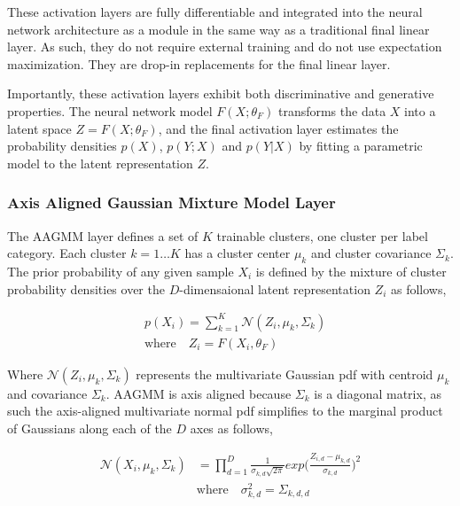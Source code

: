 \documentclass[10pt,twocolumn,letterpaper]{article}
\begin{document}
These activation layers are fully differentiable and integrated into the neural network architecture as a module in the same way as a traditional final linear layer. 
As such, they do not require external training and do not use expectation maximization.
They are drop-in replacements for the final linear layer.

Importantly, these activation layers exhibit both discriminative and generative properties. 
The neural network model $F(X;\theta_F)$ transforms the data $X$ into a latent space $Z = F(X;\theta_F)$, and the final activation layer estimates the probability densities $p(X)$, $p(Y;X)$ and $p(Y|X)$ by fitting a parametric model to the latent representation $Z$.

\subsubsection{Axis Aligned Gaussian Mixture Model Layer}

The AAGMM layer defines a set of $K$ trainable clusters, one cluster per label category. 
Each cluster $k=1 \dots K$ has a cluster center $\mu_k$ and cluster covariance $\Sigma_k$. 
The prior probability of any given sample $X_i$ is defined by the mixture of cluster probability densities over the $D$-dimensaional latent representation $Z_i$ as follows,

\begin{equation}
	\begin{aligned}
		\label{eq_px}
		&p(X_i) = \sum_{k=1}^K \mathcal{N} (Z_i, \mu_{k}, \Sigma_k) \\[10pt]
		&\text{where} \quad Z_i = F(X_i, \theta_F)
	\end{aligned}
\end{equation}

Where $\mathcal{N}(Z_i, \mu_k, \Sigma_k)$ represents the multivariate Gaussian pdf with centroid $\mu_k$ and covariance $\Sigma_k$. 
AAGMM is axis aligned because $\Sigma_k$ is a diagonal matrix, as such the axis-aligned multivariate normal pdf simplifies to the marginal product of Gaussians along each of the $D$ axes as follows,

\begin{equation}
	\begin{aligned}
		\mathcal{N} (X_i, \mu_{k}, \Sigma_k) &=  \prod_{d=1}^D \frac{1}{\sigma_{k,d}\sqrt{2 \pi}} exp \Big( \frac{Z_{i,d} - \mu_{k,d}} {\sigma_{k,d}} \Big)^2 \\[10pt]
		&\text{where} \quad \sigma^2_{k,d} = \Sigma_{k,d,d}
	\end{aligned}
\end{equation}
\end{document}
